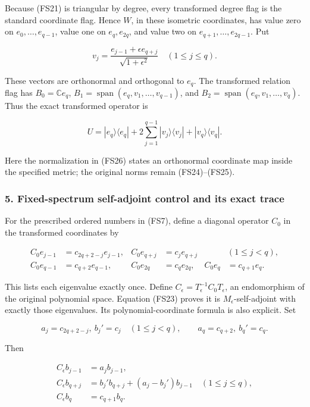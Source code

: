 \documentclass{article}
\begin{document}
Because (FS21) is triangular by degree, every transformed degree flag is the standard coordinate flag. Hence \(W\), in these isometric coordinates, has value zero on \(e_0,\ldots,e_{q-1}\), value one on \(e_q,e_{2q}\), and value two on \(e_{q+1},\ldots,e_{2q-1}\). Put

\[
v_j=\frac{e_{j-1}+\epsilon e_{q+j}}{\sqrt{1+\epsilon^2}}
\quad(1\le j\le q).
\tag{FS26}
\]

These vectors are orthonormal and orthogonal to \(e_q\). The transformed relation flag has \(B_0=\mathbb C e_q\), \(B_1=\operatorname{span}(e_q,v_1,\ldots,v_{q-1})\), and \(B_2=\operatorname{span}(e_q,v_1,\ldots,v_q)\). Thus the exact transformed operator is

\[
U=|e_q\rangle\langle e_q|
+2\sum_{j=1}^{q-1}|v_j\rangle\langle v_j|
+|v_q\rangle\langle v_q|.
\tag{FS27}
\]

Here the normalization in (FS26) states an orthonormal coordinate map inside the specified metric; the original norms remain (FS24)--(FS25).

\subsubsection{5. Fixed-spectrum self-adjoint control and its exact trace}\label{endpoint-four_window_sharpness--fixed-spectrum-self-adjoint-control-and-its-exact-trace}

For the prescribed ordered numbers in (FS7), define a diagonal operator \(C_0\) in the transformed coordinates by

\[
\begin{aligned}
C_0e_{j-1}&=c_{2q+2-j}e_{j-1},&
C_0e_{q+j}&=c_j e_{q+j}&&(1\le j<q),\\
C_0e_{q-1}&=c_{q+2}e_{q-1},&
C_0e_{2q}&=c_qe_{2q},&
C_0e_q&=c_{q+1}e_q.
\end{aligned}
\tag{FS28}
\]

This lists each eigenvalue exactly once. Define \(C_\epsilon=T_\epsilon^{-1}C_0T_\epsilon\), an endomorphism of the original polynomial space. Equation (FS23) proves it is \(M_\epsilon\)-self-adjoint with exactly those eigenvalues. Its polynomial-coordinate formula is also explicit. Set

\[
a_j=c_{2q+2-j},\ b_j'=c_j\quad(1\le j<q),
\qquad a_q=c_{q+2},\ b_q'=c_q.
\]

Then

\[
\begin{aligned}
C_\epsilon b_{j-1}&=a_j b_{j-1},\\
C_\epsilon b_{q+j}&=b_j' b_{q+j}+(a_j-b_j')b_{j-1}
\quad(1\le j\le q),\\
C_\epsilon b_q&=c_{q+1}b_q.
\end{aligned}
\tag{FS29}
\]
\end{document}
